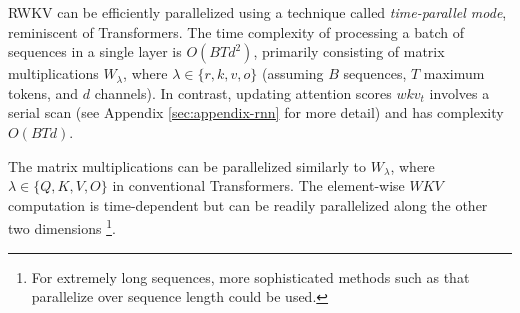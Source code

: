 \documentclass[11pt]{article}
\begin{document}
RWKV can be efficiently parallelized using a technique called \textit{time-parallel mode}, reminiscent of Transformers. The time complexity of processing a batch of sequences in a single layer is $O(BTd^2)$, primarily consisting of matrix multiplications $W_\lambda$, where $\lambda\in \{r,k,v,o\}$ (assuming $B$ sequences, $T$ maximum tokens, and $d$ channels).
In contrast, updating attention scores $wkv_t$ involves a serial scan
(see Appendix \ref{sec:appendix-rnn} for more detail) and has complexity $O(BTd)$.

The matrix multiplications can be parallelized similarly to $W_{\lambda}$, where $\lambda \in \{Q,K,V,O\}$ in conventional Transformers. The element-wise $WKV$ computation is time-dependent but can be readily parallelized along the other two dimensions \cite{lei-etal-2018-simple}\footnote{For extremely long sequences, more sophisticated methods such as \citet{Martin2017ParallelizingLR} that parallelize over sequence length could be used.}. %
\end{document}
